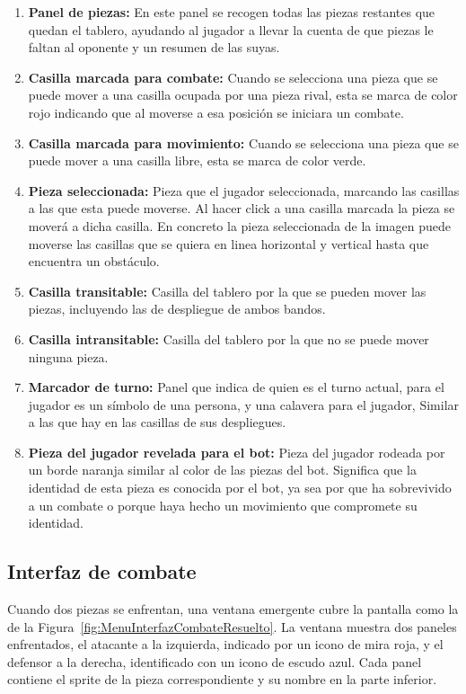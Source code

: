 \begin{enumerate}
	\item \textbf{Panel de piezas:} En este panel se recogen todas las piezas restantes que quedan el tablero, ayudando al jugador a llevar la cuenta de que piezas le faltan al oponente y un resumen de las suyas.
	\item \textbf{Casilla marcada para combate:} Cuando se selecciona una pieza que se puede mover a una casilla ocupada por una pieza rival, esta se marca de color rojo indicando que al moverse a esa posición se iniciara un combate.
	\item \textbf{Casilla marcada para movimiento:} Cuando se selecciona una pieza que se puede mover a una casilla libre, esta se marca de color verde.
	\item \textbf{Pieza seleccionada:} Pieza que el jugador seleccionada, marcando las casillas a las que esta puede moverse. Al hacer click a una casilla marcada la pieza se moverá a dicha casilla. En concreto la pieza seleccionada de la imagen puede moverse las casillas que se quiera en linea horizontal y vertical hasta que encuentra un obstáculo.
	\item \textbf{Casilla transitable:} Casilla del tablero por la que se pueden mover las piezas, incluyendo las de despliegue de ambos bandos. 
	\item \textbf{Casilla intransitable:} Casilla del tablero por la que no se puede mover ninguna pieza.
	\item \textbf{Marcador de turno:} Panel que indica de quien es el turno actual, para el jugador es un símbolo de una persona, y una calavera para el jugador, Similar a las que hay en las casillas de sus despliegues.
	\item \textbf{Pieza del jugador revelada para el bot:} Pieza del jugador rodeada por un borde naranja similar al color de las piezas del bot. Significa que la identidad de esta pieza es conocida por el bot, ya sea por que ha sobrevivido a un combate o porque haya hecho un movimiento que compromete su identidad.
\end{enumerate}

\subsection{Interfaz de combate}

Cuando dos piezas se enfrentan, una ventana emergente cubre la pantalla como la de la Figura~\ref{fig:MenuInterfazCombateResuelto}. La ventana muestra dos paneles enfrentados, el atacante a la izquierda, indicado por un icono de mira roja, y el defensor a la derecha, identificado con un icono de escudo azul. Cada panel contiene el sprite de la pieza correspondiente y su nombre en la parte inferior.

